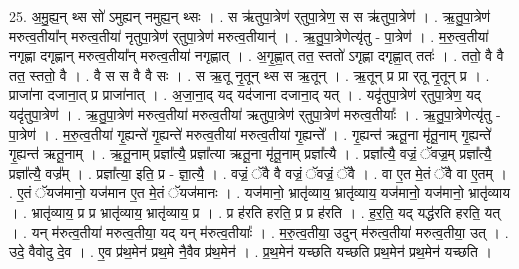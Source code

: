 \documentclass[17pt]{extarticle}
\begin{document}
25. अ॒मु॒ह्य॒न् थ्स सो॑ ऽमुह्यन् नमुह्य॒न् थ्सः । . स ऋ॑तुपा॒त्रेण॑ र्‌तुपा॒त्रेण॒ स स ऋ॑तुपा॒त्रेण॑ । . ऋ॒तु॒पा॒त्रेण॑ मरुत्व॒तीया᳚न् मरुत्व॒तीया॑ नृतुपा॒त्रेण॑ र्‌तुपा॒त्रेण॑ मरुत्व॒तीयान्॑ । . ऋ॒तु॒पा॒त्रेणेत्यृ॑तु - पा॒त्रेण॑ । . म॒रु॒त्व॒तीया॑ नगृह्णा दगृह्णान् मरुत्व॒तीया᳚न् मरुत्व॒तीया॑ नगृह्णात् । . अ॒गृ॒ह्णा॒त् तत॒ स्ततो॑ ऽगृह्णा दगृह्णा॒त् ततः॑ । . ततो॒ वै वै तत॒ स्ततो॒ वै । . वै स स वै वै सः । . स ऋ॒तू नृ॒तून् थ्स स ऋ॒तून् । . ऋ॒तून् प्र प्रा र्‌तू नृ॒तून् प्र । . प्राजा॑ना दजाना॒त् प्र प्राजा॑नात् । . अ॒जा॒ना॒द् यद् यद॑जाना दजाना॒द् यत् । . यदृ॑तुपा॒त्रेण॑ र्‌तुपा॒त्रेण॒ यद् यदृ॑तुपा॒त्रेण॑ । . ऋ॒तु॒पा॒त्रेण॑ मरुत्व॒तीया॑ मरुत्व॒तीया॑ ऋतुपा॒त्रेण॑ र्‌तुपा॒त्रेण॑ मरुत्व॒तीयाः᳚ । . ऋ॒तु॒पा॒त्रेणेत्यृ॑तु - पा॒त्रेण॑ । . म॒रु॒त्व॒तीया॑ गृ॒ह्यन्ते॑ गृ॒ह्यन्ते॑ मरुत्व॒तीया॑ मरुत्व॒तीया॑ गृ॒ह्यन्ते᳚ । . गृ॒ह्यन्त॑ ऋतू॒ना मृ॑तू॒नाम् गृ॒ह्यन्ते॑ गृ॒ह्यन्त॑ ऋतू॒नाम् । . ऋ॒तू॒नाम् प्रज्ञा᳚त्यै॒ प्रज्ञा᳚त्या ऋतू॒ना मृ॑तू॒नाम् प्रज्ञा᳚त्यै । . प्रज्ञा᳚त्यै॒ वज्रं॒ ॅवज्र॒म् प्रज्ञा᳚त्यै॒ प्रज्ञा᳚त्यै॒ वज्र᳚म् । . प्रज्ञा᳚त्या॒ इति॒ प्र - ज्ञा॒त्यै॒ । . वज्रं॒ ॅवै वै वज्रं॒ ॅवज्रं॒ ॅवै । . वा ए॒त मे॒तं ॅवै वा ए॒तम् । . ए॒तं ॅयज॑मानो॒ यज॑मान ए॒त मे॒तं ॅयज॑मानः । . यज॑मानो॒ भ्रातृ॑व्याय॒ भ्रातृ॑व्याय॒ यज॑मानो॒ यज॑मानो॒ भ्रातृ॑व्याय । . भ्रातृ॑व्याय॒ प्र प्र भ्रातृ॑व्याय॒ भ्रातृ॑व्याय॒ प्र । . प्र ह॑रति हरति॒ प्र प्र ह॑रति । . ह॒र॒ति॒ यद् यद्ध॑रति हरति॒ यत् । . यन् म॑रुत्व॒तीया॑ मरुत्व॒तीया॒ यद् यन् म॑रुत्व॒तीयाः᳚ । . म॒रु॒त्व॒तीया॒ उदुन् म॑रुत्व॒तीया॑ मरुत्व॒तीया॒ उत् । . उदे॒ वैवोदु दे॒व । . ए॒व प्र॑थ॒मेन॑ प्रथ॒मे नै॒वैव प्र॑थ॒मेन॑ । . प्र॒थ॒मेन॑ यच्छति यच्छति प्रथ॒मेन॑ प्रथ॒मेन॑ यच्छति । \newline
\end{document}
